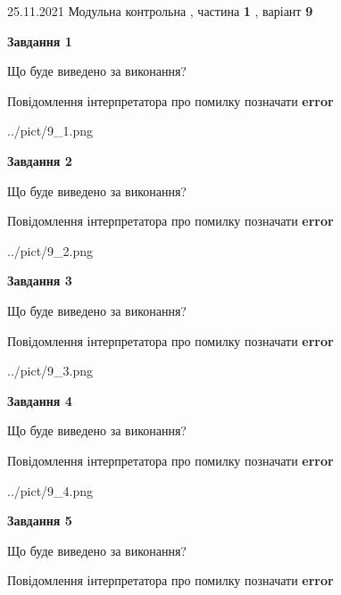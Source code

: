 \documentclass[10pt, ukrainian]{article}
\begin{document}
{25.11.2021 Модульна контрольна , частина \textbf { 1 }, варіант  \No \textbf { 9 }\par}
{
\begin {large}

{\begin {center}\textbf{Завдання 1}\end {center}}\par
Що буде виведено за виконання? \par
Повідомлення інтерпретатора про помилку позначати \textbf{error}

\begin{center}
	{../pict/9_1.png}
\end{center}
\newpage

{\begin {center}\textbf{Завдання 2}\end {center}}\par
Що буде виведено за виконання? \par
Повідомлення інтерпретатора про помилку позначати \textbf{error}

\begin{center}
	{../pict/9_2.png}
\end{center}
\newpage

{\begin {center}\textbf{Завдання 3}\end {center}}\par
Що буде виведено за виконання? \par
Повідомлення інтерпретатора про помилку позначати \textbf{error}

\begin{center}
	{../pict/9_3.png}
\end{center}
\newpage

{\begin {center}\textbf{Завдання 4}\end {center}}\par
Що буде виведено за виконання? \par
Повідомлення інтерпретатора про помилку позначати \textbf{error}

\begin{center}
	{../pict/9_4.png}
\end{center}
\newpage

{\begin {center}\textbf{Завдання 5}\end {center}}\par
Що буде виведено за виконання? \par
Повідомлення інтерпретатора про помилку позначати \textbf{error}


\end{large}}
\end{document}
